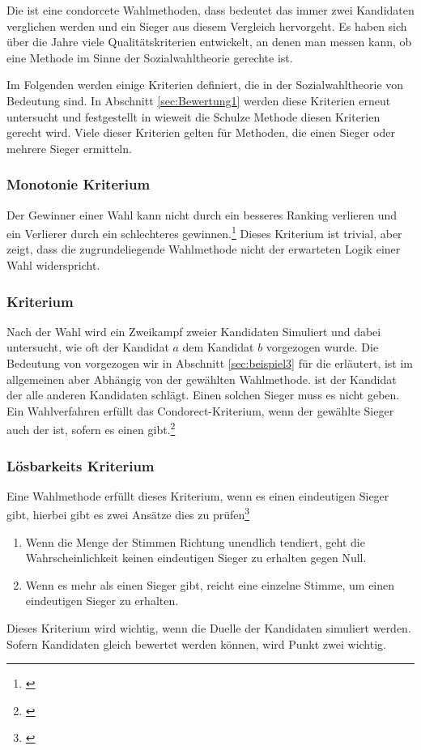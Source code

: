 Die \schulze ist eine condorcete Wahlmethoden, dass bedeutet das immer zwei Kandidaten verglichen werden und ein Sieger aus diesem Vergleich hervorgeht. Es haben sich über die Jahre viele Qualitätskriterien entwickelt, an denen man messen kann, ob eine Methode im Sinne der Sozialwahltheorie gerechte ist.

Im Folgenden werden einige Kriterien definiert, die in der Sozialwahltheorie von Bedeutung sind. In Abschnitt \ref{sec:Bewertung1} werden diese Kriterien erneut untersucht und festgestellt in wieweit die Schulze Methode diesen Kriterien gerecht wird. Viele dieser Kriterien gelten für Methoden, die einen Sieger oder mehrere Sieger ermitteln. 

\subsubsection{Monotonie Kriterium} 
\label{sec:monotoniekriterium}
Der Gewinner einer Wahl kann nicht durch ein besseres Ranking verlieren und ein Verlierer durch ein schlechteres gewinnen.\footnote{\Vgl \citet{Woodall1996}} Dieses Kriterium ist trivial, aber zeigt, dass die zugrundeliegende Wahlmethode nicht der erwarteten Logik einer Wahl widerspricht.

\subsubsection{\condorcet Kriterium} 
\label{sec:condorectKriterium}
Nach der Wahl wird ein Zweikampf zweier Kandidaten Simuliert und dabei untersucht, wie oft der Kandidat $a$ dem Kandidat $b$ vorgezogen wurde. Die Bedeutung von \glqq vorgezogen\grqq{} wir in Abschnitt \ref{sec:beispiel3} für die \schulze erläutert, ist im allgemeinen aber Abhängig von der gewählten Wahlmethode. \condorcetSieger ist der Kandidat der alle anderen Kandidaten schlägt. Einen solchen Sieger muss es nicht geben. Ein Wahlverfahren erfüllt das Condorect-Kriterium, wenn der gewählte Sieger auch der \condorcetSieger ist, sofern es einen \condorcetSieger gibt.\footnote{\Vgl \citet{Johnson2005}}

\subsubsection{Lösbarkeits Kriterium} 
\label{sec:loesbarkeitsKriterium}
Eine Wahlmethode erfüllt dieses Kriterium, wenn es einen eindeutigen Sieger gibt, hierbei gibt es zwei Ansätze dies zu prüfen\footnote{\Vgl \citet{Schulze2017}}
\begin{enumerate}
\item Wenn die Menge der Stimmen Richtung unendlich tendiert, geht die Wahrscheinlichkeit keinen eindeutigen Sieger zu erhalten gegen Null.
\item Wenn es mehr als einen Sieger gibt, reicht eine einzelne Stimme, um einen eindeutigen Sieger zu erhalten.
\end{enumerate}
Dieses Kriterium wird wichtig, wenn die Duelle der Kandidaten simuliert werden. Sofern Kandidaten gleich bewertet werden können, wird Punkt zwei wichtig.


